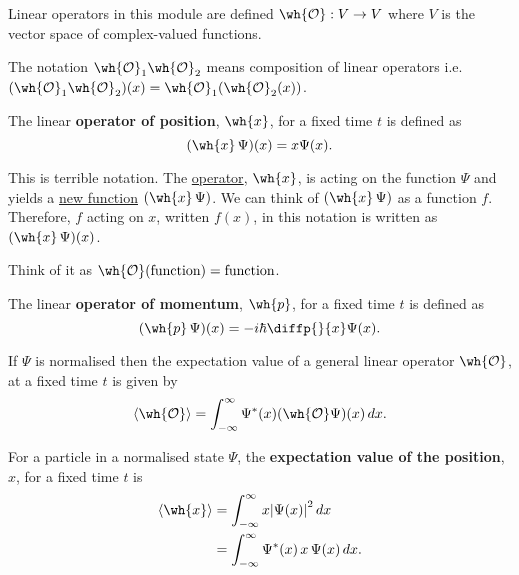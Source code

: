 \documentclass[12pt, a4paper]{article}
\begin{document}
\begin{mdremark}
    Linear operators in this module are defined \(\wh{\mathcal{O}}: V \to V\) where \(V\) is the vector space of complex-valued functions.
\end{mdremark}

\begin{theorem}
    The notation \(\wh{\mathcal{O}}_1 \wh{\mathcal{O}}_2\) means composition of linear operators i.e. \((\wh{\mathcal{O}}_1 \wh{\mathcal{O}}_2)(x) = \wh{\mathcal{O}}_1(\wh{\mathcal{O}}_2(x))\).
\end{theorem}

\begin{definition}
    The linear \textbf{operator of position}, \(\wh{x}\), for a fixed time \(t\) is defined as 
    \[(\wh{x} \, \Psi)(x) = x\Psi(x).\]
\end{definition}

\begin{mdremark}
    This is terrible notation. The \underline{operator}, \(\wh{x}\), is acting on the function \(\Psi\) and yields a \underline{new function} \((\wh{x} \, \Psi)\). We can think of \((\wh{x} \, \Psi)\) as a function \(f\). Therefore, \(f\) acting on \(x\), written \(f(x)\), in this notation is written as \((\wh{x} \, \Psi)(x)\).
\end{mdremark}

\begin{mdnote}
    Think of it as \(\wh{\mathcal{O}}(\text{function}) = \text{function}\).
\end{mdnote}

\begin{definition}
    The linear \textbf{operator of momentum}, \(\wh{p}\), for a fixed time \(t\) is defined as 
    \[(\wh{p} \, \Psi)(x) = - i\hbar \diffp{}{x} \Psi(x).\]
\end{definition}

\begin{mdthm}
    If \(\Psi\) is normalised then the expectation value of a general linear operator \(\wh{\mathcal{O}}\), at a fixed time \(t\) is given by 
    \[\langle \wh{\mathcal{O}} \rangle = \int_{-\infty}^{\infty} \Psi^*(x) (\wh{\mathcal{O}}\Psi)(x) \, dx.\]
\end{mdthm}

\begin{definition}
    For a particle in a normalised state \(\Psi\), the \textbf{expectation value of the position}, \(x\), for a fixed time \(t\) is 
    \[\begin{aligned}
        \langle \wh{x} \rangle &= \int_{-\infty}^{\infty} x \abs{\Psi(x)}^2 \, dx \\
        &= \int_{-\infty}^{\infty} \Psi^*(x) \,  x \,\Psi(x) \, dx.
    \end{aligned}\]
\end{definition}
\end{document}
